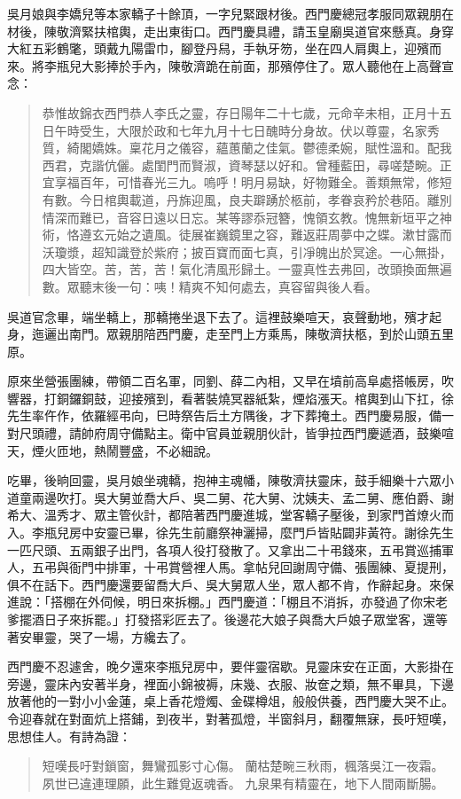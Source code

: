 吳月娘與李嬌兒等本家轎子十餘頂，一字兒緊跟材後。西門慶總冠孝服同眾親朋在材後，陳敬濟緊扶棺輿，走出東街口。西門慶具禮，請玉皇廟吳道官來懸真。身穿大紅五彩鶴氅，頭戴九陽雷巾，腳登丹舄，手執牙笏，坐在四人肩輿上，迎殯而來。將李瓶兒大影捧於手內，陳敬濟跪在前面，那殯停住了。眾人聽他在上高聲宣念：
\begin{quote}
恭惟故錦衣西門恭人李氏之靈，存日陽年二十七歲，元命辛未相，正月十五日午時受生，大限於政和七年九月十七日醜時分身故。伏以尊靈，名家秀質，綺閣嬌姝。稟花月之儀容，蘊蕙蘭之佳氣。鬱德柔婉，賦性溫和。配我西君，克諧伉儷。處閨門而賢淑，資琴瑟以好和。曾種藍田，尋嗟楚畹。正宜享福百年，可惜春光三九。嗚呼！明月易缺，好物難全。善類無常，修短有數。今日棺輿載道，丹旆迎風，良夫躃踴於柩前，孝眷哀矜於巷陌。離別情深而難已，音容日遠以日忘。某等謬忝冠簪，愧領玄教。愧無新垣平之神術，恪遵玄元始之遺風。徒展崔巍鏡里之容，難返莊周夢中之蝶。漱甘露而沃瓊漿，超知識登於紫府；披百寶而面七真，引凈魄出於冥途。一心無掛，四大皆空。苦，苦，苦！氣化清風形歸土。一靈真性去弗回，改頭換面無遍數。眾聽末後一句：咦！精爽不知何處去，真容留與後人看。
\end{quote}

吳道官念畢，端坐轎上，那轎捲坐退下去了。這裡鼓樂喧天，哀聲動地，殯才起身，迤邐出南門。眾親朋陪西門慶，走至門上方乘馬，陳敬濟扶柩，到於山頭五里原。

原來坐營張團練，帶領二百名軍，同劉、薛二內相，又早在墳前高阜處搭帳房，吹響器，打銅鑼銅鼓，迎接殯到，看著裝燒冥器紙紮，煙焰漲天。棺輿到山下扛，徐先生率仵作，依羅經弔向，巳時祭告后土方隅後，才下葬掩土。西門慶易服，備一對尺頭禮，請帥府周守備點主。衛中官員並親朋伙計，皆爭拉西門慶遞酒，鼓樂喧天，煙火匝地，熱鬧豐盛，不必細說。

吃畢，後晌回靈，吳月娘坐魂轎，抱神主魂幡，陳敬濟扶靈床，鼓手細樂十六眾小道童兩邊吹打。吳大舅並喬大戶、吳二舅、花大舅、沈姨夫、孟二舅、應伯爵、謝希大、溫秀才、眾主管伙計，都陪著西門慶進城，堂客轎子壓後，到家門首燎火而入。李瓶兒房中安靈已畢，徐先生前廳祭神灑掃，麼門戶皆貼闢非黃符。謝徐先生一匹尺頭、五兩銀子出門，各項人役打發散了。又拿出二十弔錢來，五弔賞巡捕軍人，五弔與衙門中排軍，十弔賞營裡人馬。拿帖兒回謝周守備、張團練、夏提刑，俱不在話下。西門慶還要留喬大戶、吳大舅眾人坐，眾人都不肯，作辭起身。來保進說：「搭棚在外伺候，明日來拆棚。」西門慶道：「棚且不消拆，亦發過了你宋老爹擺酒日子來拆罷。」打發搭彩匠去了。後邊花大娘子與喬大戶娘子眾堂客，還等著安畢靈，哭了一場，方纔去了。

西門慶不忍遽舍，晚夕還來李瓶兒房中，要伴靈宿歇。見靈床安在正面，大影掛在旁邊，靈床內安著半身，裡面小錦被褥，床幾、衣服、妝奩之類，無不畢具，下邊放著他的一對小小金蓮，桌上香花燈燭、金碟樽俎，般般供養，西門慶大哭不止。令迎春就在對面炕上搭鋪，到夜半，對著孤燈，半窗斜月，翻覆無寐，長吁短嘆，思想佳人。有詩為證：
\begin{quote}
短嘆長吁對鎖窗，舞鸞孤影寸心傷。
蘭枯楚畹三秋雨，楓落吳江一夜霜。
夙世已違連理願，此生難覓返魂香。
九泉果有精靈在，地下人間兩斷腸。
\end{quote}


